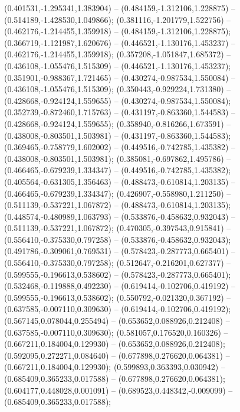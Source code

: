  (0.401531,-1.295341,1.383904) -- (0.484159,-1.312106,1.228875) -- (0.514189,-1.428530,1.049866);
 (0.381116,-1.201779,1.522756) -- (0.462176,-1.214455,1.359918) -- (0.484159,-1.312106,1.228875);
 (0.366719,-1.121987,1.620676) -- (0.446521,-1.130176,1.453237) -- (0.462176,-1.214455,1.359918);
 (0.357208,-1.051847,1.685372) -- (0.436108,-1.055476,1.515309) -- (0.446521,-1.130176,1.453237);
 (0.351901,-0.988367,1.721465) -- (0.430274,-0.987534,1.550084) -- (0.436108,-1.055476,1.515309);
 (0.350443,-0.929224,1.731380) -- (0.428668,-0.924124,1.559655) -- (0.430274,-0.987534,1.550084);
 (0.352739,-0.872460,1.715763) -- (0.431197,-0.863360,1.544583) -- (0.428668,-0.924124,1.559655);
 (0.358940,-0.816266,1.673591) -- (0.438008,-0.803501,1.503981) -- (0.431197,-0.863360,1.544583);
 (0.369465,-0.758779,1.602002) -- (0.449516,-0.742785,1.435382) -- (0.438008,-0.803501,1.503981);
 (0.385081,-0.697862,1.495786) -- (0.466465,-0.679239,1.334347) -- (0.449516,-0.742785,1.435382);
 (0.405564,-0.631305,1.356463) -- (0.488473,-0.610814,1.203135) -- (0.466465,-0.679239,1.334347);
 (0.426907,-0.558980,1.211250) -- (0.511139,-0.537221,1.067872) -- (0.488473,-0.610814,1.203135);
 (0.448574,-0.480989,1.063793) -- (0.533876,-0.458632,0.932043) -- (0.511139,-0.537221,1.067872);
 (0.470305,-0.397543,0.915841) -- (0.556410,-0.375330,0.797258) -- (0.533876,-0.458632,0.932043);
 (0.491786,-0.309061,0.769531) -- (0.578423,-0.287773,0.665401) -- (0.556410,-0.375330,0.797258);
 (0.512647,-0.216201,0.627377) -- (0.599555,-0.196613,0.538602) -- (0.578423,-0.287773,0.665401);
 (0.532468,-0.119888,0.492230) -- (0.619414,-0.102706,0.419192) -- (0.599555,-0.196613,0.538602);
 (0.550792,-0.021320,0.367192) -- (0.637585,-0.007110,0.309630) -- (0.619414,-0.102706,0.419192);
 (0.567145,0.078044,0.255494) -- (0.653652,0.088926,0.212408) -- (0.637585,-0.007110,0.309630);
 (0.581057,0.176520,0.160326) -- (0.667211,0.184004,0.129930) -- (0.653652,0.088926,0.212408);
 (0.592095,0.272271,0.084640) -- (0.677898,0.276620,0.064381) -- (0.667211,0.184004,0.129930);
 (0.599893,0.363393,0.030942) -- (0.685409,0.365233,0.017588) -- (0.677898,0.276620,0.064381);
 (0.604177,0.448028,0.001091) -- (0.689523,0.448342,-0.009099) -- (0.685409,0.365233,0.017588);
